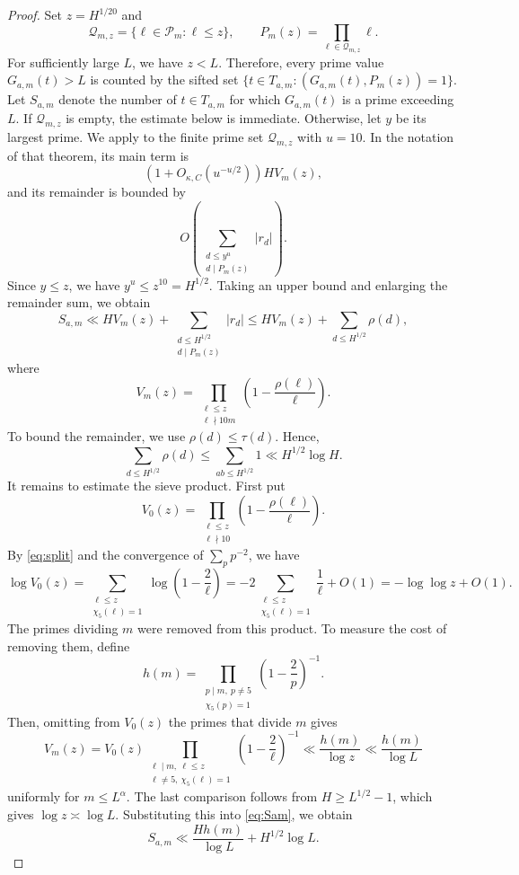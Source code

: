 \documentclass[11pt]{amsart}
\theoremstyle{definition}
\theoremstyle{remark}
\begin{document}
\begin{proof}
Set $z=H^{1/20}$ and
  \[
  \mathcal Q_{m,z}=\{\ell\in\mathcal P_m:\ell\leq z\},
  \qquad
  P_m(z)=\prod_{\ell\in\mathcal Q_{m,z}}\ell.
  \]
For sufficiently large $L$, we have $z<L$.  Therefore, every prime value
$G_{a,m}(t)>L$ is counted by the sifted set
$\{t\in T_{a,m}:(G_{a,m}(t),P_m(z))=1\}$.  Let $S_{a,m}$ denote the number
of $t\in T_{a,m}$ for which $G_{a,m}(t)$ is a prime exceeding $L$.  If
$\mathcal Q_{m,z}$ is empty, the estimate below is immediate.  Otherwise,
let $y$ be its largest prime.  We apply
\cite[Theorem 18.11(a), p.~190]{Koukoulopoulos} to the finite prime set
$\mathcal Q_{m,z}$ with $u=10$.  In the notation of that theorem, its main
term is
\[
\left(1+O_{\kappa,C}(u^{-u/2})\right)H V_m(z),
\]
and its remainder is bounded by
\[
O\left(\sum_{\substack{d\leq y^u\\d\mid P_m(z)}}|r_d|\right).
\]
Since $y\leq z$, we have $y^u\leq z^{10}=H^{1/2}$.  Taking an upper bound
and enlarging the remainder sum, we obtain
\begin{equation}\label{eq:Sam}
S_{a,m}
\ll
  HV_m(z)
  +\sum_{\substack{d\leq H^{1/2}\\ d\mid P_m(z)}}|r_d|
  \leq HV_m(z)+\sum_{d\leq H^{1/2}}\rho(d),
\end{equation}
where
\[
V_m(z)=
\prod_{\substack{\ell\leq z\\ \ell\nmid10m}}
\left(1-\frac{\rho(\ell)}\ell\right).
\]
To bound the remainder, we use $\rho(d)\leq\tau(d)$.  Hence,
\[
\sum_{d\leq H^{1/2}}\rho(d)
\leq\sum_{ab\leq H^{1/2}}1
\ll H^{1/2}\log H.
\]
It remains to estimate the sieve product.  First put
  \[
  V_0(z)=\prod_{\substack{\ell\leq z\\ \ell\nmid10}}
  \left(1-\frac{\rho(\ell)}\ell\right).
  \]
By \eqref{eq:split} and the convergence of $\sum_p p^{-2}$, we have
  \[
  \log V_0(z)
  =\sum_{\substack{\ell\leq z\\ \chi_5(\ell)=1}}
  \log\left(1-\frac2\ell\right)
  =-2\sum_{\substack{\ell\leq z\\ \chi_5(\ell)=1}}\frac1\ell+O(1)
  =-\log\log z+O(1).
  \]
The primes dividing $m$ were removed from this product.  To measure the cost
of removing them, define
\[
h(m)=
\prod_{\substack{p\mid m,\ p\neq5\\ \chi_5(p)=1}}
\left(1-\frac2p\right)^{-1}.
\]
Then, omitting from $V_0(z)$ the primes that divide $m$ gives
  \[
  V_m(z)
  =V_0(z)
  \prod_{\substack{\ell\mid m,\ \ell\leq z\\
                    \ell\neq5,\ \chi_5(\ell)=1}}
  \left(1-\frac2\ell\right)^{-1}
  \ll\frac{h(m)}{\log z}
  \ll\frac{h(m)}{\log L}
  \]
uniformly for $m\leq L^\alpha$.  The last comparison follows from
$H\geq L^{1/2}-1$, which gives $\log z\asymp\log L$.  Substituting this into
\eqref{eq:Sam}, we obtain
\begin{equation}\label{eq:Sam2}
S_{a,m}
\ll
\frac{Hh(m)}{\log L}+H^{1/2}\log L.
\end{equation}


\end{proof}
\end{document}
